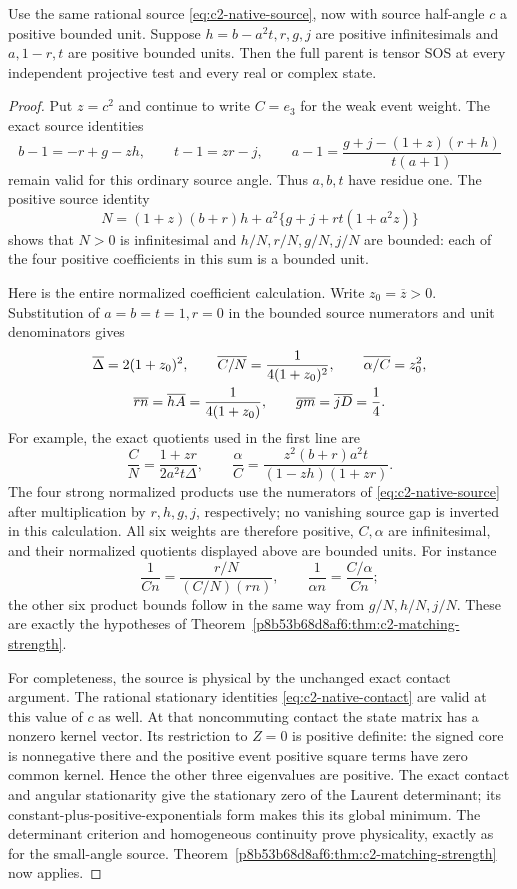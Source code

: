 \begin{corollary}
\label{p8b53b68d8af6:cor:c2-ordinary-angle-radial}
Use the same rational source \eqref{eq:c2-native-source}, now with source
half-angle $c$ a positive bounded unit.  Suppose $h=b-a^2t,r,g,j$ are
positive infinitesimals and $a,1-r,t$ are positive bounded units.
Then the full parent is tensor SOS at every independent projective test
and every real or complex state.
\end{corollary}
\begin{proof}
Put $z=c^2$ and continue to write $C=e_3$ for the weak event weight.
The exact source identities
\[
 b-1=-r+g-zh,\qquad t-1=zr-j,\qquad
 a-1=\frac{g+j-(1+z)(r+h)}{t(a+1)}
\]
remain valid for this ordinary source angle.  Thus $a,b,t$ have residue
one.  The positive source identity
\[
 N=(1+z)(b+r)h+a^2\{g+j+rt(1+a^2z)\}
\]
shows that $N>0$ is infinitesimal and $h/N,r/N,g/N,j/N$ are bounded:
each of the four positive coefficients in this sum is a bounded unit.

Here is the entire normalized coefficient calculation.  Write
$z_0=\overline z>0$.  Substitution of $a=b=t=1,r=0$ in the bounded
source numerators and unit denominators gives
\begin{gather}
 \overline\Delta=2(1+z_0)^2,\qquad
 \overline{C/N}=\frac1{4(1+z_0)^2},\qquad
 \overline{\alpha/C}=z_0^2,\notag\\
 \overline{rn}=\overline{hA}=\frac1{4(1+z_0)},\qquad
 \overline{gm}=\overline{jD}=\frac14.
\label{p8b53b68d8af6:eq:c2ms-ordinary-residues}
\end{gather}
For example, the exact quotients used in the first line are
\[
 \frac CN=\frac{1+zr}{2a^2t\Delta},\qquad
 \frac\alpha C=\frac{z^2(b+r)a^2t}{(1-zh)(1+zr)}.
\]
The four strong normalized products use the numerators of
\eqref{eq:c2-native-source} after multiplication by $r,h,g,j$, respectively;
no vanishing source gap is inverted in this calculation.
All six weights are therefore positive, $C,\alpha$ are infinitesimal,
and their normalized quotients displayed above are bounded units.
For instance
\[
 \frac1{Cn}=\frac{r/N}{(C/N)(rn)},\qquad
 \frac1{\alpha n}=\frac{C/\alpha}{Cn};
\]
the other six product bounds follow in the same way from $g/N,h/N,j/N$.
These are exactly the hypotheses of Theorem~\ref{p8b53b68d8af6:thm:c2-matching-strength}.

For completeness, the source is physical by the unchanged exact contact
argument.  The rational stationary identities
\eqref{eq:c2-native-contact} are valid at this value of $c$ as well.
At that noncommuting contact the state matrix has a nonzero kernel
vector.  Its restriction to $Z=0$ is positive definite: the signed core
is nonnegative there and the positive event positive square terms have zero common
kernel.  Hence the other three eigenvalues are positive.  The exact
contact and angular stationarity give the stationary zero of the
Laurent determinant; its constant-plus-positive-exponentials form makes
this its global minimum.  The determinant criterion and homogeneous
continuity prove physicality, exactly as for the small-angle source.
Theorem~\ref{p8b53b68d8af6:thm:c2-matching-strength} now applies.


\end{proof}
